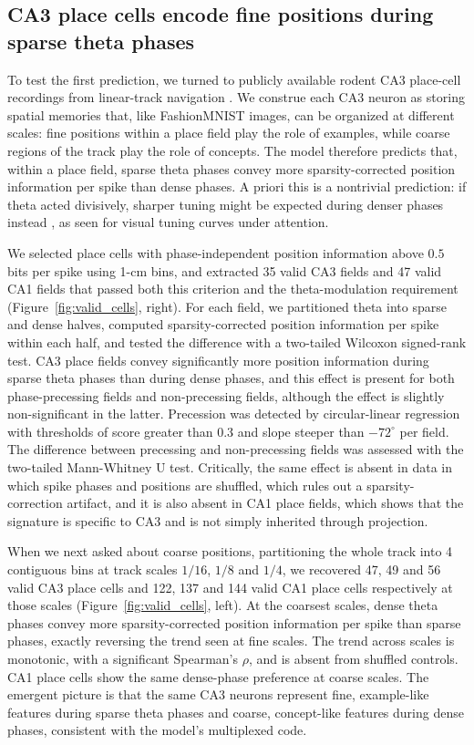 \documentclass[11pt]{article}
\begin{document}
\subsection{CA3 place cells encode fine positions during sparse theta phases}

To test the first prediction, we turned to publicly available rodent CA3
place-cell recordings from linear-track navigation
\cite{mizuseki2013hc3,skaggs1996theta}. We construe each CA3 neuron as
storing spatial memories that, like FashionMNIST images, can be organized
at different scales: fine positions within a place field play the role of
examples, while coarse regions of the track play the role of concepts. The
model therefore predicts that, within a place field, sparse theta phases
convey more sparsity-corrected position information per spike than dense
phases. A priori this is a nontrivial prediction: if theta acted divisively,
sharper tuning might be expected during denser phases instead
\cite{isaacson2011inhibition}, as seen for visual tuning curves under
attention.

We selected place cells with phase-independent position information above
$0.5$ bits per spike using 1-cm bins, and extracted 35 valid CA3 fields and
47 valid CA1 fields that passed both this criterion and the theta-modulation
requirement (Figure~\ref{fig:valid_cells}, right). For each field, we
partitioned theta into sparse and dense halves, computed sparsity-corrected
position information per spike within each half, and tested the difference
with a two-tailed Wilcoxon signed-rank test. CA3 place fields convey
significantly more position information during sparse theta phases than
during dense phases, and this effect is present for both phase-precessing
fields and non-precessing fields, although the effect is slightly
non-significant in the latter. Precession was detected by circular-linear
regression with thresholds of score greater than $0.3$ and slope steeper
than $-72^\circ$ per field. The difference between precessing and
non-precessing fields was assessed with the two-tailed Mann-Whitney U test.
Critically, the same effect is absent in data in which spike phases and
positions are shuffled, which rules out a sparsity-correction artifact,
and it is also absent in CA1 place fields, which shows that the signature
is specific to CA3 and is not simply inherited through projection.

When we next asked about coarse positions, partitioning the whole track
into 4 contiguous bins at track scales $1/16$, $1/8$ and $1/4$, we recovered
47, 49 and 56 valid CA3 place cells and 122, 137 and 144 valid CA1 place
cells respectively at those scales (Figure~\ref{fig:valid_cells}, left). At
the coarsest scales, dense theta phases convey more sparsity-corrected
position information per spike than sparse phases, exactly reversing the
trend seen at fine scales. The trend across scales is monotonic, with a
significant Spearman's $\rho$, and is absent from shuffled controls. CA1
place cells show the same dense-phase preference at coarse scales. The
emergent picture is that the same CA3 neurons represent fine,
example-like features during sparse theta phases and coarse, concept-like
features during dense phases, consistent with the model's multiplexed
code.
\end{document}
